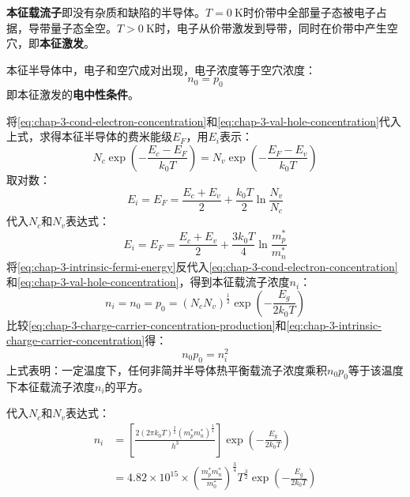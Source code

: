 \textbf{本征载流子}即没有杂质和缺陷的半导体。$T=0\ \mathrm{K}$时价带中全部量子态被电子占据，导带量子态全空。$T>0\ \mathrm{K}$时，电子从价带激发到导带，同时在价带中产生空穴，即\textbf{本征激发}。

本征半导体中，电子和空穴成对出现，电子浓度等于空穴浓度：
\begin{equation}
    n_0=p_0\label{eq:chap-3-intrinsic-excitation}
\end{equation}
即本征激发的\textbf{电中性条件}。

将\autoref{eq:chap-3-cond-electron-concentration}和\autoref{eq:chap-3-val-hole-concentration}代入上式，求得本征半导体的费米能级$E_F$，用$E_i$表示：
\begin{equation}
    N_c\exp{\left(-\frac{E_c-E_F}{k_0T}\right)}=N_v\exp{\left(-\frac{E_F-E_v}{k_0T}\right)}
\end{equation}
取对数：
\begin{equation}
    E_i=E_F=\frac{E_c+E_v}{2}+\frac{k_0T}{2}\ln{\frac{N_v}{N_c}}
\end{equation}
代入$N_c$和$N_v$表达式：
\begin{equation}
    E_i=E_F=\frac{E_c+E_v}{2}+\frac{3k_0T}{4}\ln{\frac{m_p^*}{m_n^*}}\label{eq:chap-3-intrinsic-fermi-energy}
\end{equation}
将\autoref{eq:chap-3-intrinsic-fermi-energy}反代入\autoref{eq:chap-3-cond-electron-concentration}和\autoref{eq:chap-3-val-hole-concentration}，得到本征载流子浓度$n_i$：
\begin{equation}
    n_i=n_0=p_0=\left(N_cN_v\right)^\frac{1}{2}\exp{\left(-\frac{E_g}{2k_0T}\right)}\label{eq:chap-3-intrinsic-charge-carrier-concentration}
\end{equation}
比较\autoref{eq:chap-3-charge-carrier-concentration-production}和\autoref{eq:chap-3-intrinsic-charge-carrier-concentration}得：
\begin{equation}
    n_0p_0=n_i^2\label{eq:chap-3-intinsic-charge-carrier-concentration-equation}
\end{equation}
上式表明：一定温度下，任何非简并半导体热平衡载流子浓度乘积$n_0p_0$等于该温度下本征载流子浓度$n_i$的平方。

代入$N_c$和$N_v$表达式：
\begin{align}
    n_i&=\left[\frac{2\left(2\pi k_0T\right)^\frac{3}{2}\left(m_p^*m_n^*\right)^\frac{3}{4}}{h^3}\right]\exp{\left(-\frac{E_g}{2k_0T}\right)}\\
    &=4.82\times 10^{15}\times\left(\frac{m_p^*m_n^*}{m_0^*}\right)^\frac{3}{4}T^\frac{3}{2}\exp{\left(-\frac{E_g}{2k_0T}\right)}
\end{align}

